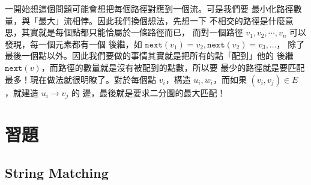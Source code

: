 \documentclass[a4paper,12pt]{book}
\begin{document}
一開始想這個問題可能會想把每個路徑對應到一個流。可是我們要
最小化路徑數量，與「最大」流相悖。因此我們換個想法，先想一下
不相交的路徑是什麼意思，其實就是每個點都只能恰屬於一條路徑而已，
而對一個路徑 $v_1, v_2, \cdots, v_n$ 可以發現，每一個元素都有一個
後繼，如 $\mathtt{next}(v_1) = v_2, \mathtt{next}(v_2) = v_3, \dots$，
除了最後一個點以外。因此我們要做的事情其實就是把所有的點「配到」他的
後繼 $\mathtt{next}(v)$，而路徑的數量就是沒有被配到的點數，所以要
最少的路徑就是要匹配最多！現在做法就很明瞭了。對於每個點 $v_i$，構造
$u_i, w_i$，而如果 $(v_i, v_j) \in E$ ，就建造 $u_i \rightarrow v_j$ 的
邊，最後就是要求二分圖的最大匹配！


\section{習題}

    
  \subsection{String Matching}



\end{document}
